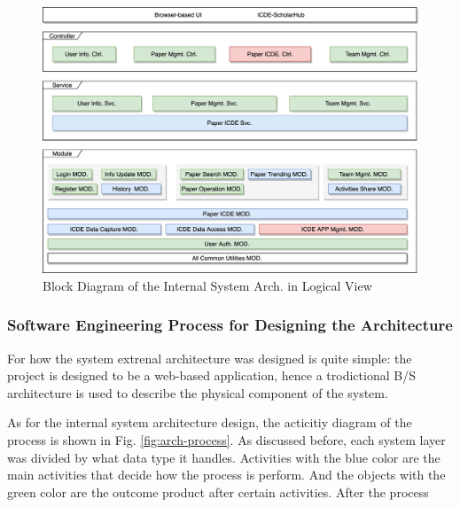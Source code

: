\documentclass[conference]{IEEEtran}
\begin{document}
\begin{figure}[!ht]
	\centering
	\includegraphics[scale=0.082]{sys-arch.png}
	\caption{Block Diagram of the Internal System Arch\protect\footnotemark[5]\protect\footnotemark[6]. in Logical View}
	\label{fig:sys-arch}
\end{figure}


\subsubsection{\textbf{Software Engineering Process for Designing the Architecture}}
\label{sec:1.1.2}

For how the system extrenal architecture was designed is quite simple: the project is designed to be a
web-based application, hence a trodictional B/S architecture is used to describe the
physical component of the system.

As for the internal system architecture design, the acticitiy diagram of the process is shown in Fig. \ref{fig:arch-process}.
As discussed before, each system layer was divided by what data type it handles.
Activities with the blue color are the main activities that decide how the process is perform.
And the objects with the green color are the outcome product after certain activities. After the process
\end{document}
